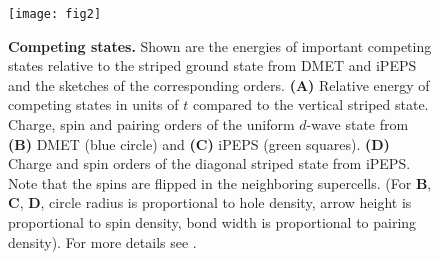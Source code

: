 \documentclass[12pt]{article}
\newcommand{\blue}{\textcolor{blue}}
\begin{document}
\begin{figure}[htpb]
  \centering
  \texttt{[image: fig2]}
  \caption{{\bf Competing states.} Shown are the energies of important competing states relative to the striped ground state from DMET and iPEPS and the sketches of the corresponding orders.
	  {\bf(A)} Relative energy of competing states in units of $t$ compared to the vertical striped state.
	  Charge, spin and pairing orders of the uniform $d$-wave state from {\bf(B)} DMET (blue circle) and {\bf(C)} iPEPS (green squares).
	  {\bf(D)} Charge and spin orders of the diagonal striped state from iPEPS. Note that
  the spins are flipped in the neighboring supercells. (For {\bf B}, {\bf C}, {\bf D}, circle radius is proportional to hole density, arrow height is proportional to spin density, bond width is proportional to pairing density). For more details see \cite{supplementary}.}
  \label{fig:relative_energies}
\end{figure}


\end{document}
